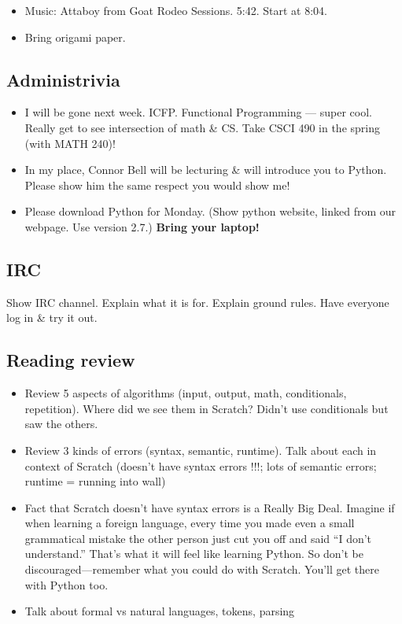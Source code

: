 \documentclass{article}
\begin{document}
\begin{itemize}
\item Music: Attaboy from Goat Rodeo Sessions. 5:42.  Start at 8:04.
\item Bring origami paper.
\end{itemize}

\subsection*{Administrivia}

\begin{itemize}
\item I will be gone next week.  ICFP.  Functional Programming ---
  super cool.  Really get to see intersection of math \& CS. Take CSCI
  490 in the spring (with MATH 240)!
\item In my place, Connor Bell will be lecturing \& will introduce you
  to Python.  Please show him the same respect you would show me!
\item Please download Python for Monday.  (Show python website, linked
  from our webpage.  Use version 2.7.)  \textbf{Bring your laptop!}
\end{itemize}

\subsection*{IRC}

Show IRC channel. Explain what it is for. Explain ground rules. Have
everyone log in \& try it out.

\subsection*{Reading review}

\begin{itemize}
\item Review 5 aspects of algorithms (input, output, math,
  conditionals, repetition).  Where did we see them in Scratch? Didn't
  use conditionals but saw the others.
\item Review 3 kinds of errors (syntax, semantic, runtime).  Talk
  about each in context of Scratch (doesn't have syntax errors !!!; lots
  of semantic errors; runtime = running into wall)
\item Fact that Scratch doesn't have syntax errors is a Really Big
  Deal.  Imagine if when learning a foreign language, every time you
  made even a small grammatical mistake the other person just cut you off and
  said ``I don't understand.''  That's what it will feel like learning
  Python.  So don't be discouraged---remember what you could do with
  Scratch.  You'll get there with Python too.
\item Talk about formal vs natural languages, tokens, parsing
\end{itemize}
\end{document}
